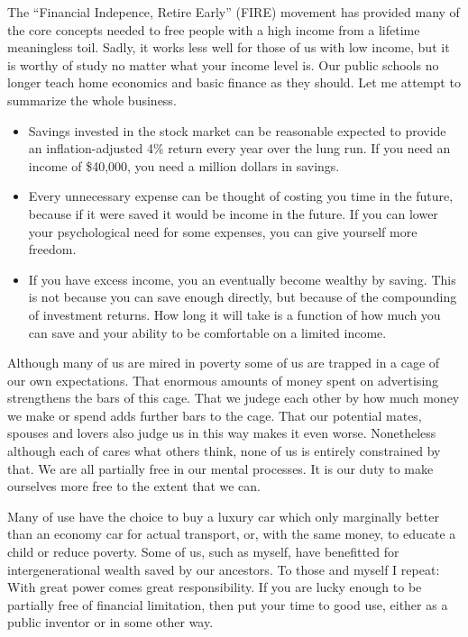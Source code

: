 \documentclass[
	fontsize=10pt, %
	twoside=false, %
	secnumdepth=1, %
]{kaobook}
\begin{document}
The ``Financial Indepence, Retire Early'' (FIRE) movement has
provided many of the core concepts needed to free people with
a high income from a lifetime meaningless toil.
Sadly, it works
less well for those of us with low income, but it is worthy of study
no matter what your income level is.
Our public schools no longer teach home economics and basic
finance as they should. Let me attempt to summarize the whole
business.

\begin{itemize}
\item Savings invested in the stock market can be reasonable expected to provide an inflation-adjusted 4\% return every
  year over the lung run.
If you need an income of \$40,000, you need a million dollars in savings.
\item Every unnecessary expense can be thought of costing you time in
  the future, because if it were saved it would be income in the
  future.
  If you can lower your psychological need for some expenses,
you can give yourself more freedom.
\item If you have excess income, you an eventually become wealthy
  by saving.
  This is not because you can save enough directly, but
  because of the compounding of investment returns.
  How long it will take
is a function of how much you can save and your ability to be
comfortable on a limited income.
\end{itemize}

Although many of us are mired in poverty some of us are trapped in a cage of our own
expectations.
That enormous amounts of money spent
on advertising strengthens the bars of this cage.
That we judege each other by how much money we make
or spend adds further bars to the cage.
That our potential mates, spouses and lovers also judge
us in this way makes it even worse.
Nonetheless although each of cares what others think,
none of us is entirely constrained by that.
We are all partially free in our mental processes.
It is our duty to make ourselves more free to the extent that we can.

Many of use have the choice to buy a luxury car
which only marginally better than an economy car
for actual transport, or, with the same money,
to educate a child or reduce poverty.
Some of us, such as myself, have benefitted for intergenerational
wealth saved by our ancestors.
To those and myself I repeat: With great
power comes great responsibility.
If you are lucky enough to be
partially free of financial limitation, then put your time to good
use, either as a public inventor or in some other way.
\end{document}
